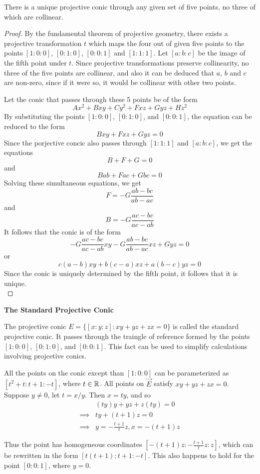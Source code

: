 \begin{prop}
  There is a unique projective conic through any given set of five points, no three of which are
  collinear.
\end{prop}

\begin{proof}
 By the fundamental theorem of projective geometry, there exists a projective transformation
 $t$ which maps the four out of given five points to the points $[1:0:0]$, $[0:1:0]$, $[0:0:1]$
 and $[1:1:1]$. Let $[a:b:c]$ be the image of the fifth point under $t$. Since projective
 transformations preserve collinearity, no three of the five points are collinear, and also
 it can be deduced that $a$, $b$ and $c$ are non-zero, since if it were so, it would be collinear
 with other two points.

 \vspace{1ex}

 \noindent
 Let the conic that passes through these 5 points be of the form
 \[
   Ax^2+Bxy+Cy^2+Fxz+Gyz+Hz^2
 \]
 By substituting the points $[1:0:0]$, $[0:1:0]$, and $[0:0:1]$, the equation can be reduced
 to the form
 \[
   Bxy+Fxz+Gyz=0
 \]
 Since the porjective concic also passes through $[1:1:1]$ and $[a:b:c]$, we get the equations
 \[
   B+F+G=0
 \]
 and
 \[
   Bab+Fac+Gbc=0
 \]
 Solving these simultaneous equations, we get
 \[
   F=-G\frac{ab-bc}{ab-ac}
 \]
 and
 \[
   B= -G\frac{ac-bc}{ac-ab}
 \]
 It follows that the conic is of the form
 \[
   -G\frac{ac-bc}{ac-ab}xy-G\frac{ab-bc}{ab-ac}xz+Gyz=0
 \]
 or
 \[
   c(a-b)xy+b(c-a)xz+a(b-c)yz=0
 \]
 Since the conic is uniquely determined by the fifth point, it follows that it is unique.\\
\end{proof}

\begin{remark}
  \textbf{The Standard Projective Conic}

  The projective conic $E=\{[x:y:z]:xy+yz+zx=0\}$ is called the standard projective conic.
  It passes through the traingle of reference formed by the points $[1:0:0]$, $[0:1:0]$, and
  $[0:0:1]$. This fact can be used to simplify calculations involving projcetive conics.

  All the points on the conic except than $[1:0:0]$ can be parameterized as $[t^2+t:t+1:-t]$,
  where $t\in\mathbb{R}$. All points on $\vec{E}$ satisfy $xy+yz+zx=0$. Suppose $y\ne 0$, let $t=x/y$. Then
  $x=ty$, and so
  \begin{align*}
    & (ty)y+yz+z(ty)=0 \\
    \implies & ty+(t+1)z=0 \\
    \implies & y=-\frac{t+1}{t}z, x=-(t+1)z
  \end{align*}

  Thus the point has homogeneous coordinates $\left[-(t+1)z:-\frac{t+1}{t}z:z\right]$, which can
  be rewritten in the form $[t(t+1):t+1:-t]$. This also happens to hold for the point $[0:0:1]$,
  where $y=0$.
\end{remark}

